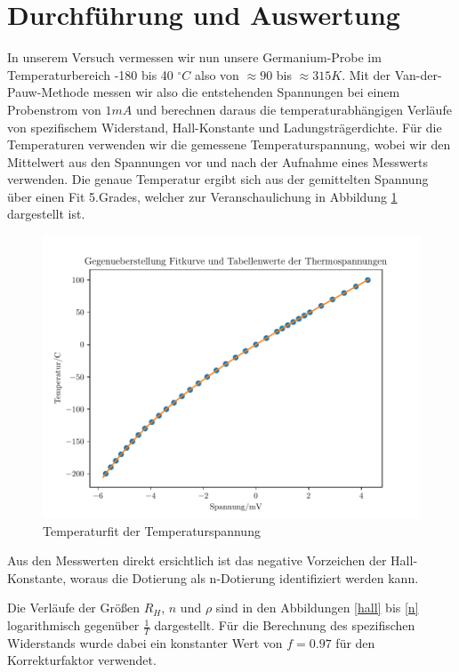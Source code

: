 \section{Durchführung und Auswertung}
In unserem Versuch vermessen wir nun unsere Germanium-Probe im Temperaturbereich -180 bis 40 $^{\circ}C$ also von $\approx 90$ bis $\approx 315 K$. Mit der Van-der-Pauw-Methode messen wir also die entstehenden Spannungen bei einem Probenstrom von $1mA$ und berechnen daraus die temperaturabhängigen Verläufe von spezifischem Widerstand, Hall-Konstante und Ladungsträgerdichte. Für die Temperaturen verwenden wir die gemessene Temperaturspannung, wobei wir den Mittelwert aus den Spannungen vor und nach der Aufnahme eines Messwerts verwenden. Die genaue Temperatur ergibt sich aus der gemittelten Spannung über einen Fit 5.Grades, welcher zur Veranschaulichung in Abbildung \ref{temp} dargestellt ist.

\begin{figure}[htbp] 
     \includegraphics[scale=0.7]{temp_fit.pdf}
  \caption{Temperaturfit der Temperaturspannung}
  \label{temp}
\end{figure}

Aus den Messwerten direkt ersichtlich ist das negative Vorzeichen der Hall-Konstante, woraus die Dotierung als n-Dotierung identifiziert werden kann.

Die Verläufe der Größen $R_H$, $n$ und $\rho$ sind in den Abbildungen \ref{hall} bis \ref{n} logarithmisch gegenüber $\frac{1}{T}$ dargestellt. Für die Berechnung des spezifischen Widerstands wurde dabei ein konstanter Wert von $f=0.97$ für den Korrekturfaktor verwendet. 

